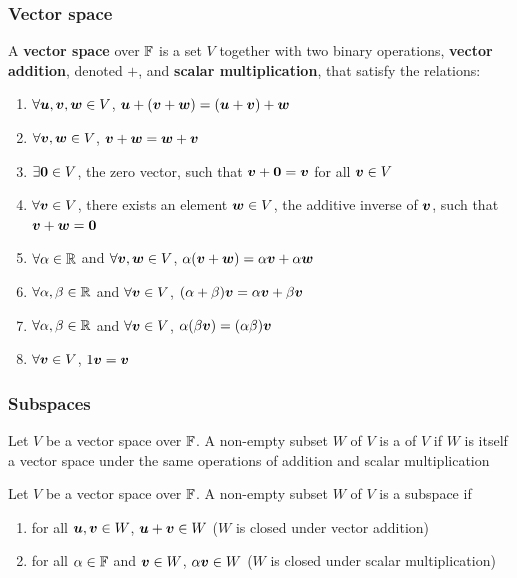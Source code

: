 \documentclass[aspectratio=169]{beamer}\usepackage[]{graphicx}\usepackage[]{xcolor}
\begin{document}
\begin{frame}
\frametitle{Vector space}
	\begin{definition}
		A \textbf{vector space} over $\mathbb{F}$ is a set $V$
		together with two binary operations, \textbf{vector addition}, denoted $+$,
		and \textbf{scalar multiplication}, that satisfy the relations:
		\begin{enumerate}
			\item $\forall\bm{u}, \bm{v}, \bm{w}\in V$, $\bm{u}+(\bm{v}+\bm{w})=(\bm{u}+\bm{v})+\bm{w}$
			\item $\forall\bm{v}, \bm{w}\in V$, $\bm{v} + \bm{w} = \bm{w} + \bm{v}$
			\item $\exists\b0\in V$, the zero vector, such that $\bv +\b0
			= \bv$ for all $\bm{v}\in V$
			\item $\forall\bm{v}\in V$, there exists an element $\bm{w}\in V$, the additive
			inverse of $\bm{v}$, such that $\bv + \bw = \b0$
			\item $\forall\alpha\in\mathbb{R}$ and $\forall \bm{v},\bm{w}\in V$, $\alpha(\bm{v} + \bm{w}) = \alpha \bm{v} +
			\alpha \bm{w}$
			\item $\forall\alpha,\beta\in\mathbb{R}$ and $\forall \bm{v}\in V$, $(\alpha+\beta)\bm{v}=
			\alpha \bm{v} + \beta \bm{v}$
			\item $\forall\alpha,\beta\in\mathbb{R}$ and $\forall\bm{v}\in V$, $\alpha (\beta\bm{v}) =
			(\alpha\beta)\bm{v}$
			\item $\forall\bm{v}\in V$, $1\bm{v} =\bm{v}$
		\end{enumerate}
	\end{definition}
\end{frame}

\begin{frame}
\frametitle{Subspaces}
	\begin{definition}[Subspace]
		Let $V$ be a vector space over $\mathbb{F}$. A non-empty subset $W$ of $V$ is a  of $V$ if $W$ is itself a vector space under the same operations of addition and scalar multiplication
	\end{definition}
	\vfill
	\begin{importantdefinition}
		Let $V$ be a vector space over $\mathbb{F}$. A non-empty subset $W$ of $V$ is a subspace if
		\begin{enumerate}
			\item for all $\bm{u}, \bm{v} \in W$, $\bm{u} + \bm{v} \in W$ ($W$ is closed under vector addition)
			\item for all $\alpha \in \mathbb{F}$ and $\bm{v} \in W$, $\alpha\bm{v} \in W$ ($W$ is closed under scalar multiplication)
		\end{enumerate}
	\end{importantdefinition}
\end{frame}
\end{document}
